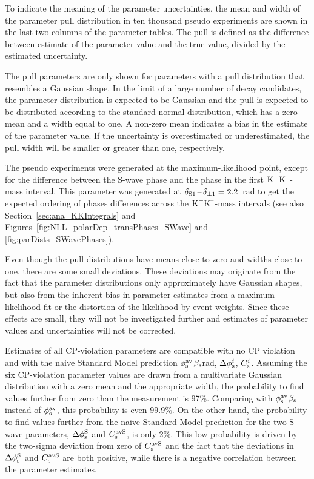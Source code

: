 To indicate the meaning of the parameter uncertainties, the mean and width of the parameter pull distribution in ten thousand pseudo
experiments are shown in the last two columns of the parameter tables. The pull is defined as the difference between estimate of the
parameter value and the true value, divided by the estimated uncertainty.

The pull parameters are only shown for parameters with a pull distribution that resembles a Gaussian shape. In the limit of a large number
of decay candidates, the parameter distribution is expected to be Gaussian and the pull is expected to be distributed according to the
standard normal distribution, which has a zero mean and a width equal to one. A non-zero mean indicates a bias in the estimate of the
parameter value. If the uncertainty is overestimated or underestimated, the pull width will be smaller or greater than one, respectively.

The pseudo experiments were generated at the maximum-likelihood point, except for the difference between the S-wave phase and the
\BstoJpsiphi{} phase in the first $\KK$-mass interval. This parameter was generated at $\delSperp[\text{1}]=2.2$~rad to get the expected
ordering of phases differences across the $\KK$-mass intervals (see also Section~\ref{sec:ana_KKIntegrals} and
Figures~\ref{fig:NLL_polarDep_transPhases_SWave} and \ref{fig:parDists_SWavePhases}).

Even though the pull distributions have means close to zero and widths close to one, there are some small deviations. These deviations may
originate from the fact that the parameter distributions only approximately have Gaussian shapes, but also from the inherent bias in
parameter estimates from a maximum-likelihood fit or the distortion of the likelihood by event weights. Since these effects are small, they
will not be investigated further and estimates of parameter values and uncertainties will not be corrected.

Estimates of all CP-violation parameters are compatible with no CP violation and with the naive Standard Model prediction
$\phisav$\texteq{}$\bs$\mbox{\textapprox{}\unitsp{}rad}, $\Delphisi$, $\Csi$. Assuming the six \BstoJpsiphi{}
CP-violation parameter values are drawn from a multivariate Gaussian distribution with a zero mean and the appropriate width, the
probability to find values further from zero than the measurement is 97\%. Comparing with $\phisav$\texteq{}$\bs$ instead of
$\phisav$, this probability is even 99.9\%. On the other hand, the probability to find values further from the naive Standard Model
prediction for the two S-wave parameters, $\DelphisS$ and $\CsavS$, is only 2\%. This low probability is driven by the two-sigma deviation
from zero of $\CsavS$ and the fact that the deviations in $\DelphisS$ and $\CsavS$ are both positive, while there is a negative correlation
between the parameter estimates.

